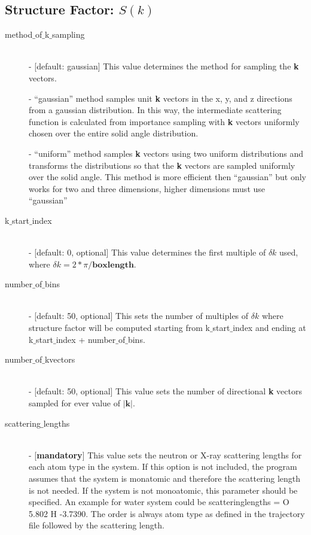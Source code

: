 \documentclass{article}
\begin{document}
\subsection{Structure Factor: $S(k)$} \label{sec::sofk_parm}
\begin{description}		
	\item[method$\_$of$\_$k$\_$sampling] \hfill \\
	- [default: gaussian] This value determines the method for sampling the \textbf{k} vectors.
	 	
	- ``gaussian'' method samples unit \textbf{k} vectors in the x, y, and z directions from a gaussian distribution.  In this way, the intermediate scattering function is calculated from importance sampling with \textbf{k} vectors uniformly chosen over the entire solid angle distribution.
	
	- ``uniform'' method samples \textbf{k} vectors using two uniform distributions and transforms the distributions so that the \textbf{k} vectors are sampled uniformly over the solid angle.  This method is more efficient then ``gaussian'' but only works for two and three dimensions, higher dimensions must use ``gaussian''
	
	\item[k$\_$start$\_$index] \hfill \\
	- [default: 0, optional] This value determines the first multiple of $\delta k$ used, where $\delta k = 2*\pi/\textbf{boxlength}$.  
		
	\item[number$\_$of$\_$bins] \hfill \\
	- [default: 50, optional] This sets the number of multiples of $\delta k$ where structure factor will be computed starting from k$\_$start$\_$index and ending at k$\_$start$\_$index + number$\_$of$\_$bins. 
	
	\item[number$\_$of$\_$kvectors] \hfill \\
	- [default: 50, optional] This value sets the number of directional \textbf{k} vectors sampled for ever value of $|\bm{k}|$.  
	
	\item[scattering$\_$lengths] \hfill \\
	- [\textbf{mandatory}] This value sets the neutron or X-ray scattering lengths for each atom type in the system.  If this option is not included, the program assumes that the system is monatomic and therefore the scattering length is not needed.  If the system is not monoatomic, this parameter should be specified. An example for water system could be scatteringlengths = O 5.802 H -3.7390. The order is always atom type as defined in the trajectory file followed by the scattering length.

\end{description}
\end{document}
